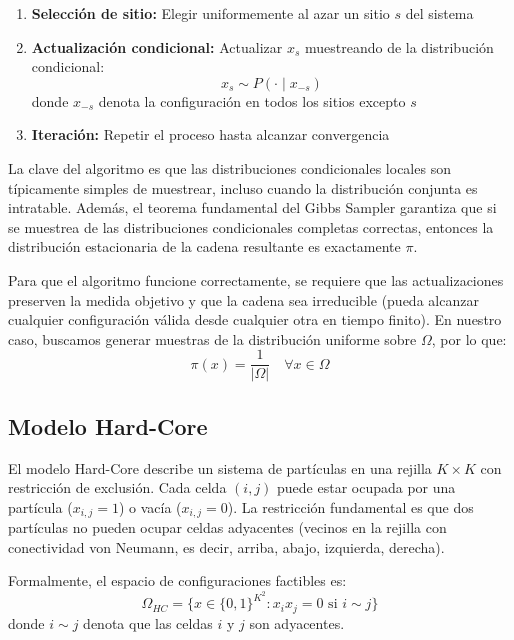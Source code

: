 \begin{enumerate}
    \item \textbf{Selección de sitio:} Elegir uniformemente al azar un sitio $s$ del sistema
    \item \textbf{Actualización condicional:} Actualizar $x_s$ muestreando de la distribución condicional:
    \begin{equation}
    x_s \sim P(\cdot \mid x_{-s})
    \end{equation}
    donde $x_{-s}$ denota la configuración en todos los sitios excepto $s$
    \item \textbf{Iteración:} Repetir el proceso hasta alcanzar convergencia
\end{enumerate}

La clave del algoritmo es que las distribuciones condicionales locales son típicamente simples de muestrear, incluso cuando la distribución conjunta es intratable. Además, el teorema fundamental del Gibbs Sampler garantiza que si se muestrea de las distribuciones condicionales completas correctas, entonces la distribución estacionaria de la cadena resultante es exactamente $\pi$.

Para que el algoritmo funcione correctamente, se requiere que las actualizaciones preserven la medida objetivo y que la cadena sea irreducible (pueda alcanzar cualquier configuración válida desde cualquier otra en tiempo finito). En nuestro caso, buscamos generar muestras de la distribución uniforme sobre $\Omega$, por lo que:
\begin{equation}
\pi(x) = \frac{1}{|\Omega|} \quad \forall x \in \Omega
\end{equation}

\subsection{Modelo Hard-Core}

El modelo Hard-Core describe un sistema de partículas en una rejilla $K \times K$ con restricción de exclusión. Cada celda $(i,j)$ puede estar ocupada por una partícula ($x_{i,j} = 1$) o vacía ($x_{i,j} = 0$). La restricción fundamental es que dos partículas no pueden ocupar celdas adyacentes (vecinos en la rejilla con conectividad von Neumann, es decir, arriba, abajo, izquierda, derecha).

Formalmente, el espacio de configuraciones factibles es:
\begin{equation}
\Omega_{HC} = \{x \in \{0,1\}^{K^2} : x_i x_j = 0 \text{ si } i \sim j\}
\end{equation}
donde $i \sim j$ denota que las celdas $i$ y $j$ son adyacentes.

